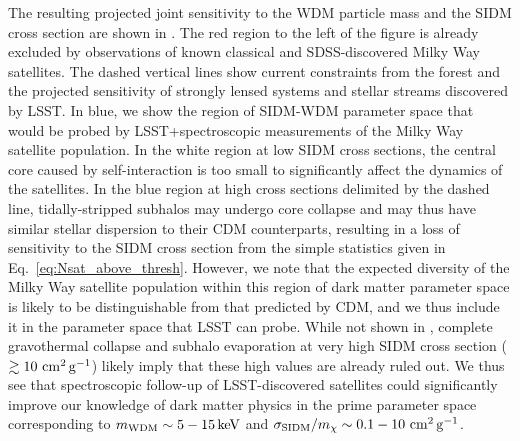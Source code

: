 The resulting projected joint sensitivity to the WDM particle mass and the SIDM cross section are shown in . 
The red region to the left of the figure is already excluded by observations of known classical and SDSS-discovered Milky Way satellites. 
The dashed vertical lines show current constraints from the \Lya forest \citep{2017PhRvD..96b3522I} and the projected sensitivity of strongly lensed systems and stellar streams discovered by LSST.
In blue, we show the region of SIDM-WDM parameter space that would be probed by LSST+spectroscopic measurements of the Milky Way satellite population. 
In the white region at low SIDM cross sections, the central core caused by self-interaction is too small to significantly affect the dynamics of the satellites. In the blue region at high cross sections delimited by the dashed line, tidally-stripped subhalos may undergo core collapse and may thus have similar stellar dispersion to their CDM counterparts, resulting in a loss of sensitivity to the SIDM cross section from the simple statistics given in Eq.~\eqref{eq:Nsat_above_thresh}. However, we note that the expected diversity of the Milky Way satellite population within this region of dark matter parameter space \citep{Nishikawa:2019lsc} is likely to be distinguishable from that predicted by CDM, and we thus include it in the parameter space that LSST can probe. While not shown in , complete gravothermal collapse and subhalo evaporation at very high SIDM cross section ($\gtrsim 10\mathrm{\,\mathrm{\,cm}^2\mathrm{\,g}^{-1}}$) likely imply that these high values are already ruled out.  We thus see that spectroscopic follow-up of LSST-discovered satellites could significantly improve our knowledge of dark matter physics in the prime parameter space corresponding to $m_{\rm WDM} \sim 5-15 \mathrm{\,keV}$ and $\sigma_{\rm SIDM}/m_\chi \sim 0.1-10 \mathrm{\,\mathrm{\,cm}^2\mathrm{\,g}^{-1}}$.
